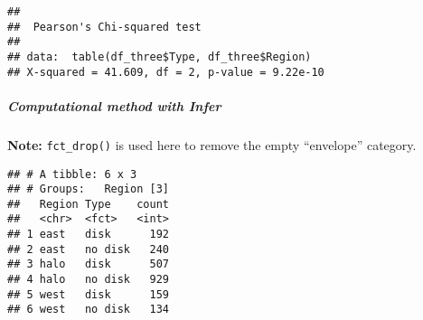 \documentclass[]{article}
\newenvironment{Shaded}{\begin{snugshade}}{\end{snugshade}}
\newcommand{\CommentTok}[1]{\textcolor[rgb]{0.56,0.35,0.01}{\textit{#1}}}
\newcommand{\DataTypeTok}[1]{\textcolor[rgb]{0.13,0.29,0.53}{#1}}
\newcommand{\KeywordTok}[1]{\textcolor[rgb]{0.13,0.29,0.53}{\textbf{#1}}}
\newcommand{\NormalTok}[1]{#1}
\newcommand{\OperatorTok}[1]{\textcolor[rgb]{0.81,0.36,0.00}{\textbf{#1}}}
\newcommand{\StringTok}[1]{\textcolor[rgb]{0.31,0.60,0.02}{#1}}
\let\oldsubparagraph\subparagraph
\renewcommand{\subparagraph}[1]{\oldsubparagraph{#1}\mbox{}}
\begin{document}
\begin{verbatim}
## 
##  Pearson's Chi-squared test
## 
## data:  table(df_three$Type, df_three$Region)
## X-squared = 41.609, df = 2, p-value = 9.22e-10
\end{verbatim}

\hypertarget{computational-method-with-infer-2}{%
\subparagraph{Computational method with
Infer}\label{computational-method-with-infer-2}}

\textbf{Note:} \texttt{fct\_drop()} is used here to remove the empty
``envelope'' category.

\begin{Shaded}
\end{Shaded}

\begin{verbatim}
## # A tibble: 6 x 3
## # Groups:   Region [3]
##   Region Type    count
##   <chr>  <fct>   <int>
## 1 east   disk      192
## 2 east   no disk   240
## 3 halo   disk      507
## 4 halo   no disk   929
## 5 west   disk      159
## 6 west   no disk   134
\end{verbatim}

\begin{Shaded}
\end{Shaded}
\end{document}
